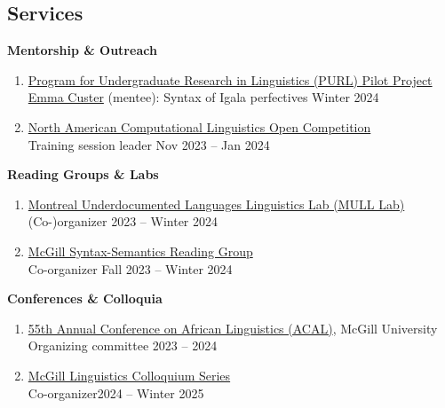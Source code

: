 \documentclass[margin,line]{resume}
\begin{document}
\begin{resume}

	\section{\mysidestyle Services}


	\textbf{Mentorship \& Outreach}
	\begin{enumerate}[-, leftmargin=1em, topsep=4pt]
		\item[] \href{https://www.mcgill.ca/cogsci/research/cogs396}{Program for Undergraduate Research in Linguistics (PURL) Pilot Project}\\
		      \hphantom{...}\href{https://www.linkedin.com/in/emma-custer-648345252}{Emma Custer} (mentee): Syntax of Igala perfectives \hfill Winter 2024

		\item[] \href{https://naclo.org/}{North American Computational Linguistics Open Competition}\\
		      \hphantom{...}Training session leader \hfill Nov 2023 -- Jan 2024
	\end{enumerate}

	\textbf{Reading Groups \& Labs}
	\begin{enumerate}[-, leftmargin=1em, topsep=4pt]
		\item[] \href{https://mcling.blogs.mcgill.ca/category/mull-lab/}{Montreal Underdocumented Languages Linguistics Lab (MULL Lab)}\\
		      \hphantom{...}(Co-)organizer \hfill 2023 -- Winter 2024

		\item[] \href{https://mcling.blogs.mcgill.ca/category/syntax-semantics-group/}{McGill Syntax-Semantics Reading Group}\\
		      \hphantom{...}Co-organizer \hfill Fall 2023 -- Winter 2024
	\end{enumerate}

	\textbf{Conferences \& Colloquia}
	\begin{enumerate}[-, leftmargin=1em, topsep=4pt]
		\item[] \href{https://acal55.mull-lab.org/}{55th Annual Conference on African Linguistics (ACAL)}, McGill University\\
		      \hphantom{...}Organizing committee \hfill 2023 -- 2024

		\item[] \href{https://www.mcgill.ca/linguistics/events/colloquium-series}{McGill Linguistics Colloquium Series}\\
		      \hphantom{...}Co-organizer\hfill 2024 -- Winter 2025
	\end{enumerate}


\end{resume}
\end{document}

